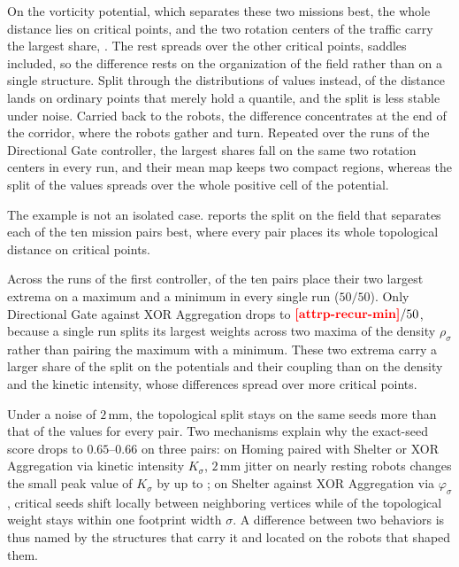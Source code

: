\documentclass[pdflatex,sn-apa]{sn-jnl}
\begin{document}
On the vorticity potential, which separates these two missions best, the whole distance lies on critical points, and
the two rotation centers of the traffic carry the largest share, . The rest spreads over
the other critical points, saddles included, so the difference rests on the organization of the field rather than on a
single structure. Split through the distributions of values instead,  of the distance lands on
ordinary points that merely hold a quantile, and the split is less stable under noise. Carried back to the robots,
the difference concentrates at the end of the corridor, where the robots gather and turn. Repeated over the
 runs of the Directional Gate controller, the largest shares fall on the same two rotation centers in
every run, and their mean map keeps two compact regions, whereas the split of the values spreads over the whole
positive cell of the potential.

The example is not an isolated case.  reports the split on the field that separates each of the
ten mission pairs best, where every pair places its whole topological distance on critical points.

\begin{table}[!htb]
\centering
\caption{The split of the distance between the Top-1 exemplars of each pair on its best field (\cref{fig:pairs}):
share of the two largest extrema, runs where they recur, share kept under $2$\,mm of noise.}
\label{tab:attribution}
\end{table}

Across the  runs of the first controller,  of the ten pairs place their two largest
extrema on a maximum and a minimum in every single run ($50/50$). Only Directional Gate against XOR Aggregation
drops to $\nm{attrp-recur-min}/50$, because a single run splits its largest weights across two maxima of the density
$\rho_\sigma$ rather than pairing the maximum with a minimum. These two extrema carry a larger share of the split
on the potentials and their coupling than on the density and the kinetic intensity, whose differences spread over more
critical points.

Under a noise of $2$\,mm, the topological split stays on the same seeds more than that of the values for every pair.
Two mechanisms explain why the exact-seed score drops to $0.65$--$0.66$ on three pairs: on Homing paired with
Shelter or XOR Aggregation via kinetic intensity $K_\sigma$, $2$\,mm jitter on nearly resting robots changes the small
peak value of $K_\sigma$ by up to ; on Shelter against XOR Aggregation via
$\varphi_\sigma$, critical seeds shift locally between neighboring vertices while  of the
topological weight stays within one footprint width $\sigma$. A difference between two behaviors is thus named by
the structures that carry it and located on the robots that shaped them.
\end{document}
